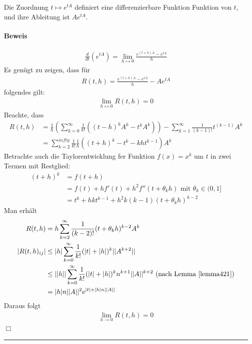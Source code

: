 \begin{satz} %
\label{satz423}
Die Zuordnung $t \mapsto e^{tA}$ definiert eine differenzierbare Funktion Funktion von $t$, und ihre Ableitung ist $A e^{tA}$.
\end{satz}
\paragraph{Beweis}
\begin{align}
\frac{d}{dt}(e^{tA}) = \lim_{h \mapsto 0} \frac{e^{(t+h) A} - e^{tA}}{h}
\end{align}
Es genügt zu zeigen, dass für
\begin{align}
R(t,h) = \frac{e^{(t+h) A} - e^{tA}}{h} - A e^{tA}
\end{align}
folgendes gilt:
\begin{align}
\lim_{h \mapsto 0} R(t, h) = 0
\end{align}
Beachte, dass
\begin{align}
R(t, h) &= \frac{1}{h} \left ( \sum_{k=0}^{\infty} \frac{1}{k!} ((t-h)^k A^k - t^k A^k) \right ) - \sum_{k=1}^{\infty} \frac{1}{(k-1)!} t^{(k-1)} A^k \\
&= \sum_{k=2}^{infty} \frac{1}{k!} \frac{1}{h} ((t+h)^k - t^k - k h t^{k-1}) A^k
\end{align}
Betrachte auch die Taylorentwicklung fer Funktion $f(x) = x^k$ um $t$ in zwei Termen mit Restglied:
\begin{align}
(t+h)^k &= f(t + h) \\
&= f(t) + h f' (t) + h^2 f'' (t+ \theta_k h) \text{ mit } \theta_k \in (0,1] \\
&= t^k + hkt^{k-1} + h^2 k (k-1)(t+ \theta_k h)^{k-2}
\end{align}
Man erhält
\begin{align}
R(t, h) &= h \sum_{k=2}^{\infty} \frac{1}{(k-2)!} (t+ \theta_k h)^{k-2} A^k \\
|R(t, h)_{ij}| &\leq |h| \sum_{k=0}^{\infty} \frac{1}{k!} (|t| + |h|)^k ||A^{k+2}|| \\
&\leq ||h|| \sum_{k=0}^{\infty} \frac{1}{k!} (|t| + |h|)^k n^{k+1} ||A||^{k+2} \text{ (nach Lemma \ref{lemma421})} \\
&= |h| n ||A||^2 e^{|t| + |h| n ||A||}
\end{align}
Daraus folgt 
\begin{align}
\lim_{h \rightarrow 0} R(t, h)  = 0
\end{align}
\hspace*{1cm} \hfill $\Box$
\vspace*{0.2cm} \\ \rule{\linewidth}{0.3mm}\vspace*{0.1cm}
